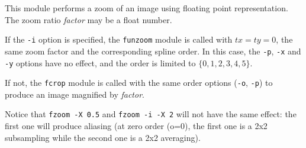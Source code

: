 This module performs a zoom of an image using floating point representation.
The zoom ratio {\em factor} may be a float number.

\medskip

If the \verb+-i+ option is specified, the \verb+funzoom+ module is called
with $tx=ty=0$, the same zoom factor and the corresponding spline order. 
In this case, the \verb+-p+, 
\verb+-x+ and \verb+-y+ options have no effect, and the order is limited
to $\{0,1,2,3,4,5\}$.

\medskip

If not, the \verb+fcrop+ module is called 
with the same order options (\verb+-o+, \verb+-p+) 
to produce an image magnified by {\em factor}.


\medskip

Notice that \verb+fzoom -X 0.5+ and \verb+fzoom -i -X 2+ will not have the
same effect: the first one will produce aliasing (at zero order (o=0), 
the first
one is a 2x2 subsampling while the second one is a 2x2 averaging).
